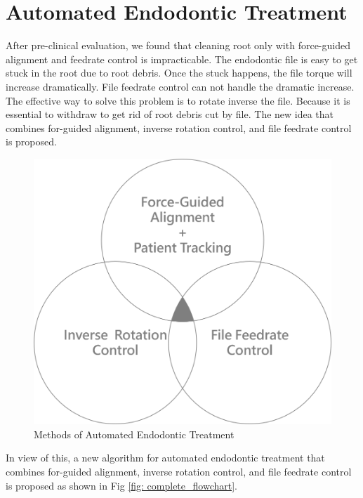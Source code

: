 \section{Automated Endodontic Treatment}
\hspace*{6mm}After pre-clinical evaluation, we found that cleaning root only with force-guided alignment and feedrate control is impracticable. The endodontic file is easy to get stuck in the root due to root debris. Once the stuck happens, the file torque will increase dramatically. File feedrate control can not handle the dramatic increase. The effective way to solve this problem is to rotate inverse the file. Because it is essential to withdraw to get rid of root debris cut by file. The new idea that combines for-guided alignment, inverse rotation control, and file feedrate control is proposed.
\begin{figure}[htbp]
\begin{center}
\includegraphics[width=0.7\linewidth]{Images/combine.png}
\end{center}
\caption{Methods of Automated Endodontic Treatment}
\label{fig: combine}
\end{figure}
\par
In view of this, a new algorithm for automated endodontic treatment that combines for-guided alignment, inverse rotation control, and file feedrate control  is proposed as shown in Fig \ref{fig: complete_flowchart}.
